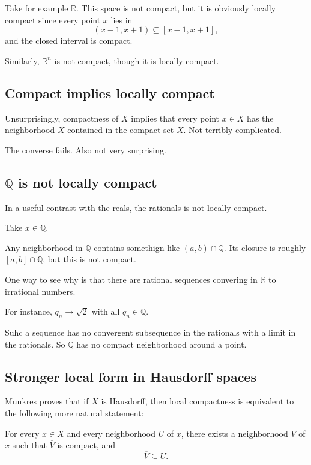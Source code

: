 \documentclass[11pt]{article}
\begin{document}
Take for example $\mathbb R$. This space is 
not compact, but it is obviously locally compact since 
every point $x$ lies in 
\[
    (x-1, x+1) \subseteq [x-1,x+1],
\]
and the closed interval is compact. 

Similarly, $\mathbb R^n$ is not compact, though it is 
locally compact. 

\subsection{Compact implies locally compact}

Unsurprisingly, compactness of $X$ implies that 
every point $x \in X$ has the neighborhood $X$ contained 
in the compact set $X$. Not terribly complicated. 

The converse fails. Also not very surprising. 

\subsection{$\mathbb Q$ is not locally compact}

In a useful contrast with the reals, the rationals 
is not locally compact. 

Take $x \in \mathbb Q$. 

Any neighborhood in $\mathbb Q$ contains somethign like 
$(a,b) \cap \mathbb Q$. Its closure is 
roughly $[a,b] \cap \mathbb Q$, but this is 
not compact. 

One way to see why is that there are rational 
sequences convering in $\mathbb R$ to irrational numbers. 

For instance, $q_n \to \sqrt 2$ with all $q_n \in \mathbb Q$. 

Suhc a sequence has no convergent subsequence in the rationals 
with a limit in the rationals. 
So $\mathbb Q$ has no compact neighborhood around a 
point. 

\subsection{Stronger local form in Hausdorff spaces}

Munkres proves that if $X$ is Hausdorff, then local 
compactness is equivalent to the following more 
natural statement: 

For every $x \in X$ and every neighborhood $U$ of 
$x$, there exists a neighborhood $V$ of 
$x$ such that $\overline V$ is compact, and 
\[
    \overline V \subseteq U. 
\]
\end{document}
